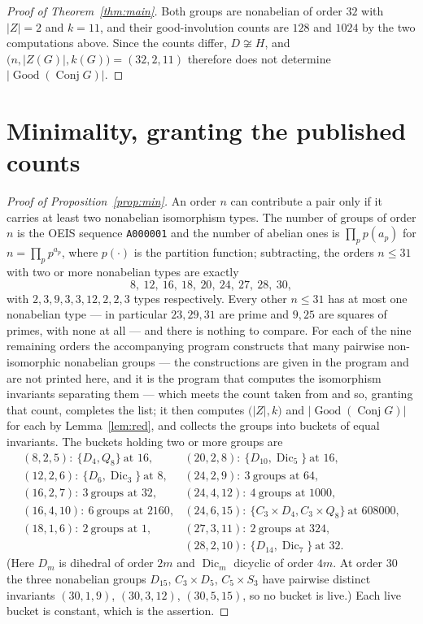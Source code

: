 \documentclass[11pt]{amsart}
\theoremstyle{definition}
\newcommand{\Conj}{\operatorname{Conj}}
\newcommand{\Good}{\operatorname{Good}}
\newcommand{\Zc}{Z}
\newcommand{\Dic}{\operatorname{Dic}}
\begin{document}
\begin{proof}[Proof of Theorem~\ref{thm:main}]
Both groups are nonabelian of order $32$ with $\lvert \Zc\rvert=2$ and $k=11$, and their
good-involution counts are $128$ and $1024$ by the two computations above. Since the counts
differ, $D\not\cong H$, and $\bigl(n,\lvert \Zc(G)\rvert,k(G)\bigr)=(32,2,11)$ therefore
does not determine $\lvert\Good(\Conj G)\rvert$.
\end{proof}

\section{Minimality, granting the published counts}

\begin{proof}[Proof of Proposition~\ref{prop:min}]
An order $n$ can contribute a pair only if it carries at least two nonabelian isomorphism
types. The number of groups of order $n$ is the OEIS sequence \texttt{A000001}
\cite{A000001} and the number of abelian ones is $\prod_p p(a_p)$ for $n=\prod_p p^{a_p}$,
where $p(\cdot)$ is the partition function; subtracting, the orders $n\le 31$ with two or
more nonabelian types are exactly
\[
 8,\ 12,\ 16,\ 18,\ 20,\ 24,\ 27,\ 28,\ 30 ,
\]
with $2,3,9,3,3,12,2,2,3$ types respectively. Every other $n\le 31$ has at most one
nonabelian type --- in particular $23,29,31$ are prime and $9,25$ are squares of primes,
with none at all --- and there is nothing to compare. For each of the nine remaining orders
the accompanying program constructs that many pairwise non-isomorphic nonabelian groups ---
the constructions are given in the program and are not printed here, and it is the program
that computes the isomorphism invariants separating them --- which meets the count taken from
\cite{A000001} and so, granting that count, completes the list; it then computes $\bigl(\lvert \Zc\rvert,k\bigr)$ and
$\lvert\Good(\Conj G)\rvert$ for each by Lemma~\ref{lem:red}, and collects the groups into
buckets of equal invariants. The buckets holding two or more groups are
\[
\begin{array}{ll}
 (8,2,5):\ \{D_4,Q_8\}\ \text{at }16,
 &(20,2,8):\ \{D_{10},\Dic_5\}\ \text{at }16,\\
 (12,2,6):\ \{D_6,\Dic_3\}\ \text{at }8,
 &(24,2,9):\ 3\ \text{groups at }64,\\
 (16,2,7):\ 3\ \text{groups at }32,
 &(24,4,12):\ 4\ \text{groups at }1000,\\
 (16,4,10):\ 6\ \text{groups at }2160,
 &(24,6,15):\ \{C_3{\times}D_4,C_3{\times}Q_8\}\ \text{at }608000,\\
 (18,1,6):\ 2\ \text{groups at }1,
 &(27,3,11):\ 2\ \text{groups at }324,\\
 &(28,2,10):\ \{D_{14},\Dic_7\}\ \text{at }32.
\end{array}
\]
(Here $D_m$ is dihedral of order $2m$ and $\Dic_m$ dicyclic of order $4m$. At order $30$
the three nonabelian groups $D_{15}$, $C_3\times D_5$, $C_5\times S_3$ have pairwise
distinct invariants $(30,1,9)$, $(30,3,12)$, $(30,5,15)$, so no bucket is live.) Each live
bucket is constant, which is the assertion.
\end{proof}
\end{document}
